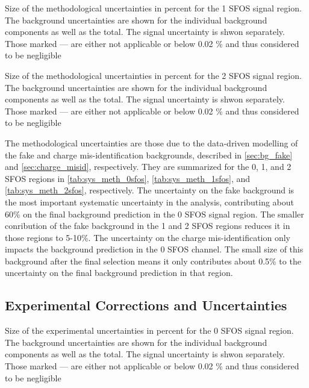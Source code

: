 \begin{table}[ht!]
\centering

\caption{Size of the methodological uncertainties in percent for the 1 SFOS signal region. The background uncertainties are shown for the individual background components as well as the total. The signal uncertainty is shwon separately. Those marked --- are either not applicable or below 0.02 \% and thus considered to be negligible}
\label{tab:sys_meth_1sfos}
\end{table}

\begin{table}[ht!]
\centering

\caption{Size of the methodological uncertainties in percent for the 2 SFOS signal region. The background uncertainties are shown for the individual background components as well as the total. The signal uncertainty is shwon separately. Those marked --- are either not applicable or below 0.02 \% and thus considered to be negligible}
\label{tab:sys_meth_2sfos}
\end{table}

The methodological uncertainties are those due to the data-driven
modelling of the fake and charge mis-identification backgrounds,
described in \sec\ref{sec:bg_fake} and \sec\ref{sec:charge_misid},
respectively.
They are summarized for the 0, 1, and 2 SFOS regions
in \tab\ref{tab:sys_meth_0sfos}, 
\tab\ref{tab:sys_meth_1sfos}, and
\tab\ref{tab:sys_meth_2sfos}, respectively.
The uncertainty on the fake background is the most important
systematic uncertainty in the analysis, contributing about 60\%
on the final background prediction in the 0 SFOS signal region.
The smaller conribution of the fake background in the 1 and 2 SFOS
regions reduces it in those regions to 5-10\%.
The uncertainty on the charge mis-identification only impacts the 
background prediction in the 0 SFOS channel.  The small size
of this background after the final selection means it only contributes
about 0.5\% to the uncertainty on the final background prediction in that
region.

\subsection{Experimental Corrections and Uncertainties}
\begin{table}[ht!]
\centering

\caption{Size of the experimental uncertainties in percent for the 0 SFOS signal region. The background uncertainties are shown for the individual background components as well as the total. The signal uncertainty is shwon separately. Those marked --- are either not applicable or below 0.02 \% and thus considered to be negligible}
\label{tab:sys_exp_0sfos}
\end{table}

